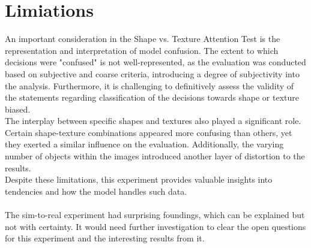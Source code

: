 		
	
	
	
	
	
	
	
	\section{Limiations} %
	\label{sec:limitations}
		An important consideration in the Shape vs. Texture Attention Test is the representation and interpretation of model confusion. The extent to which decisions were "confused" is not well-represented, as the evaluation was conducted based on subjective and coarse criteria, introducing a degree of subjectivity into the analysis. Furthermore, it is challenging to definitively assess the validity of the statements regarding classification of the decisions towards shape or texture biased.\\
		The interplay between specific shapes and textures also played a significant role. Certain shape-texture combinations appeared more confusing than others, yet they exerted a similar influence on the evaluation. Additionally, the varying number of objects within the images introduced another layer of distortion to the results. \\
		Despite these limitations, this experiment provides valuable insights into tendencies and how the model handles such data.\\
		\\
		The sim-to-real experiment had surprising foundings, which can be explained but not with certainty. It would need further investigation to clear the open questions for this experiment and the interesting results from it.
	
	
	
	
	\iffalse
	Diskussion - Bias Experiment: In the bias experiment it is difficult to say if a prediction is biased towards texture or shape. All confusing data is only confusing on texture level, so a texture biased model should perform poorly in comparison to a shape biased model. But also a shape biased model will use texture information and the question is how much and how the impact really is. In addition there are other influences, like amount of objects per scene, brightness, reflective texture, novel texture, novel shape and all of these can influence the result. -> my opinion? what does the results look like?
	It seems like that there are learned shape and texture dependent decisions
	\fi
	
	
	








